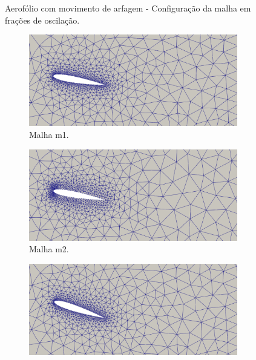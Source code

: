 \begin{figure}[h!]
    \centering
    \caption{Aerofólio com movimento de arfagem - Configuração da malha em frações de oscilação.}
    \begin{subfigure}{.49\linewidth}
        \centering
        \caption*{Malha m1.}
        \includegraphics[width=\linewidth]{Figuras/rotating-airfoil/m11.png}
    \end{subfigure}
    \begin{subfigure}{.49\linewidth}
        \centering
        \caption*{Malha m2.}
        \includegraphics[width=\linewidth]{Figuras/rotating-airfoil/m21.png}
    \end{subfigure}
    \caption*{Instante $t=8,0$.}
    \begin{subfigure}{.49\linewidth}
        \centering
        \includegraphics[width=\linewidth]{Figuras/rotating-airfoil/m12.png}

\end{subfigure}
\end{figure}
